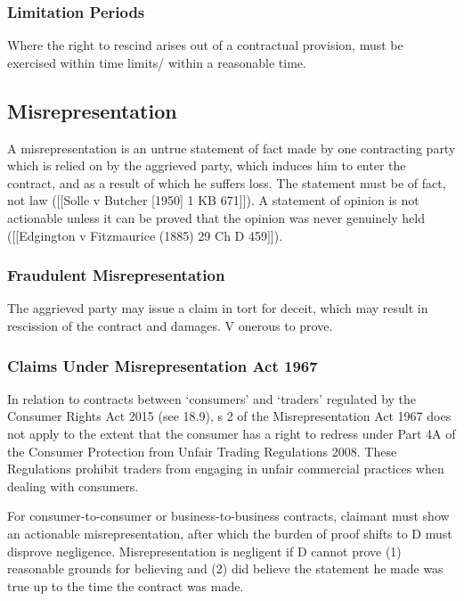 \documentclass[
]{article}
\begin{document}
\hypertarget{limitation-periods-1}{%
\subsubsection{Limitation Periods}\label{limitation-periods-1}}

Where the right to rescind arises out of a contractual provision, must
be exercised within time limits/ within a reasonable time.

\hypertarget{misrepresentation}{%
\subsection{Misrepresentation}\label{misrepresentation}}

A misrepresentation is an untrue statement of fact made by one
contracting party which is relied on by the aggrieved party, which
induces him to enter the contract, and as a result of which he suffers
loss. The statement must be of fact, not law ({[}{[}Solle v Butcher
{[}1950{]} 1 KB 671{]}{]}). A statement of opinion is not actionable
unless it can be proved that the opinion was never genuinely held
({[}{[}Edgington v Fitzmaurice (1885) 29 Ch D 459{]}{]}).

\hypertarget{fraudulent-misrepresentation}{%
\subsubsection{Fraudulent
Misrepresentation}\label{fraudulent-misrepresentation}}

The aggrieved party may issue a claim in tort for deceit, which may
result in rescission of the contract and damages. V onerous to prove.

\hypertarget{claims-under-misrepresentation-act-1967}{%
\subsubsection{Claims Under Misrepresentation Act
1967}\label{claims-under-misrepresentation-act-1967}}

In relation to contracts between `consumers' and `traders' regulated by
the Consumer Rights Act 2015 (see 18.9), s 2 of the Misrepresentation
Act 1967 does not apply to the extent that the consumer has a right to
redress under Part 4A of the Consumer Protection from Unfair Trading
Regulations 2008. These Regulations prohibit traders from engaging in
unfair commercial practices when dealing with consumers.

For consumer-to-consumer or business-to-business contracts, claimant
must show an actionable misrepresentation, after which the burden of
proof shifts to D must disprove negligence. Misrepresentation is
negligent if D cannot prove (1) reasonable grounds for believing and (2)
did believe the statement he made was true up to the time the contract
was made.
\end{document}
